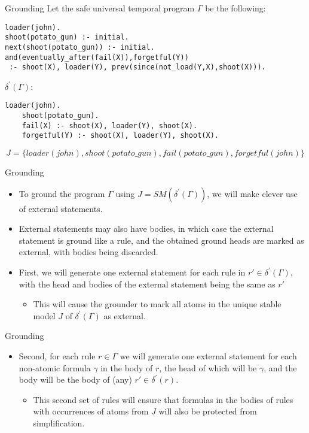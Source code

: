 \documentclass[aspectratio=169,xcolor=svgnames]{beamer}
\theoremstyle{theoremstyle_space}
\begin{document}
\begin{frame}[t,fragile]{Grounding}
  Let the safe universal temporal program $\Gamma$ be the following:
  \begin{lstlisting}[language=clingo,numbers=none]
loader(john).
shoot(potato_gun) :- initial.
next(shoot(potato_gun)) :- initial.
and(eventually_after(fail(X)),forgetful(Y)) 
 :- shoot(X), loader(Y), prev(since(not_load(Y,X),shoot(X))).
  \end{lstlisting}
  $\delta^{\prime}(\Gamma)$:
  \begin{lstlisting}[language=clingo,numbers=none]
    loader(john).
    shoot(potato_gun).
    fail(X) :- shoot(X), loader(Y), shoot(X).
    forgetful(Y) :- shoot(X), loader(Y), shoot(X).
  \end{lstlisting}
  $$
  J = \{ loader(john), shoot(potato\_gun), fail(potato\_gun), forgetful(john) \}
  $$
\end{frame}

\begin{frame}[t,fragile]{Grounding}
  \begin{itemize}
  \item To ground the program $\Gamma$ using
    $J=SM(\delta^{\prime}(\Gamma))$, we will make clever use of
    external statements.
  \item External statements may also have bodies, in which case the
    external statement is ground like a rule, and the obtained ground
    heads are marked as external, with bodies being discarded.
  \item First, we will generate one external statement for each rule
    in $r' \in \delta^\prime(\Gamma)$, with the head and bodies of the
    external statement being the same as $r'$
    \begin{itemize}
    \item This will cause the grounder to mark all atoms in the unique
      stable model $J$ of $\delta^\prime(\Gamma)$ as external.
    \end{itemize}
  \end{itemize}
\end{frame}

\begin{frame}[t,fragile]{Grounding}
  \begin{itemize}
  \item Second, for each rule $r \in \Gamma$ we will generate one
    external statement for each non-atomic formula $\gamma$ in the
    body of $r$, the head of which will be $\gamma$, and the body will
    be the body of (any) $r' \in \delta^{\prime}(r)$.
    \begin{itemize}
    \item This second set of rules will ensure that formulas in the
      bodies of rules with occurrences of atoms from $J$ will also be
      protected from simplification.
    \end{itemize}
  \end{itemize}
\end{frame}
\end{document}
